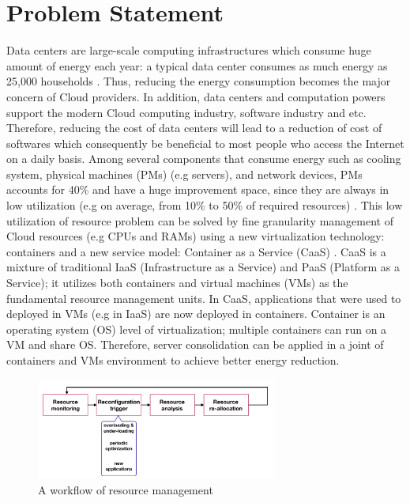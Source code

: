 \section{Problem Statement}

Data centers are large-scale computing infrastructures which consume huge amount of energy each year: a typical data center consumes as much energy as 25,000 households \cite{Dayarathna:2016ua}. Thus, reducing the energy consumption becomes the major concern of Cloud providers. 
In addition, data centers and computation powers support the modern Cloud computing industry, software industry and etc. Therefore, reducing the cost of data centers will lead to a reduction of cost of softwares which consequently be beneficial to most people who access the Internet on a daily basis.
Among several components that consume energy such as cooling system, physical machines (PMs) (e.g servers), and network devices, PMs accounts for 40\% and have a huge improvement space, since they are always in low utilization (e.g on average, from 10\% to 50\% of required resources) \cite{Barroso:2007jt,Shen:2015hm}. This low utilization of resource problem can be solved by fine granularity management of Cloud resources (e.g CPUs and RAMs) using a new virtualization technology: containers \cite{Felter:2015ki, He:2012im, Soltesz:2007cu} and a new service model: Container as a Service (CaaS) \cite{Piraghaj:2015uf}. CaaS is a mixture of traditional IaaS (Infrastructure as a Service) \cite{Mell:2011jj} and PaaS (Platform as a Service); it utilizes both containers and virtual machines (VMs) as the fundamental resource management units.
In CaaS, applications that were used to deployed in VMs (e.g in IaaS) are now deployed in containers. Container is an operating system (OS) level of virtualization; multiple containers can run on a VM and share OS. Therefore, server consolidation \cite{Varasteh:2015fu} can be applied in a joint of containers and VMs environment to achieve better energy reduction.



\begin{figure}
	\centering
	\includegraphics[width=0.7\textwidth]{pics/workflow_management.png}
	\caption{A workflow of resource management \cite{Mishra:2012kx}}
	\label{fig:workflow}
\end{figure}

